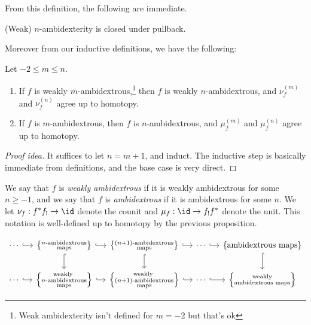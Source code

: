 From this definition, the following are immediate.

\begin{proposition} (Weak) $n$-ambidexterity is closed under pullback.
\end{proposition}

Moreover from our inductive definitions, we have the following:

\begin{proposition} Let $-2 \le m \le n$. 
\begin{enumerate}
    \item If $f$ is weakly $m$-ambidextrous,\footnote{Weak ambidexterity isn't defined for $m=-2$ but that's ok} then $f$ is weakly $n$-ambidextrous, and $\nu_f^{(m)}$ and $\nu_f^{(n)}$ agree up to homotopy.
    \item  If $f$ is $m$-ambidextrous, then $f$ is $n$-ambidextrous, and $\mu_f^{(m)}$ and $\mu_f^{(n)}$ agree up to homotopy.
\end{enumerate}
\end{proposition}
\begin{proof}[Proof idea] It suffices to let $n=m+1$, and induct. The inductive step is basically immediate from definitions, and the base case is very direct.
\end{proof}



\begin{definition} We say that $f$ is \textit{weakly ambidextrous} if it is weakly ambidextrous for some $n\ge -1$, and we say that $f$ is \textit{ambidextrous} if it is ambidextrous for some $n$. We let $\nu_f : f^\ast f_! \to \id$ denote the counit and $\mu_f: \id \to f_! f^\ast$ denote the unit. This notation is well-defined up to homotopy by the previous proposition.
\end{definition}

\[ \begin{tikzcd}[column sep=small]
    \cdots\rar[hook] & {\left\{ \substack{n\text{-ambidextrous} \\\text{maps} }\right\}}\rar[hook]\dar[hook] & {\left\{\substack{ (n+1)\text{-ambidextrous} \\ \text{maps}} \right\}}\rar[hook]\dar[hook] & \cdots\rar[hook] & {\left\{\text{ambidextrous maps} \right\}}\dar[hook]\\
    \cdots\rar[hook] & {\left\{\substack{\text{weakly } \\ n\text{-ambidextrous} \\ \text{maps}} \right\}}\rar[hook] & {\left\{\substack{\text{weakly } \\ (n+1)\text{-ambidextrous} \\ \text{maps}} \right\}}\rar[hook] & \cdots\rar[hook] & {\left\{\substack{\text{weakly} \\ \text{ambidextrous maps}} \right\}}
\end{tikzcd} \]

